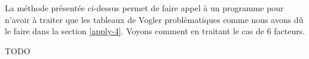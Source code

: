 \leavevmode
\smallskip

La méthode présentée ci-dessus permet de faire appel à un programme pour n'avoir à traiter que les tableaux de Vogler problématiques comme nous avons dû le faire dans la section \ref{apply-4}. Voyons comment en traitant le cas de $6$ facteurs.

TODO